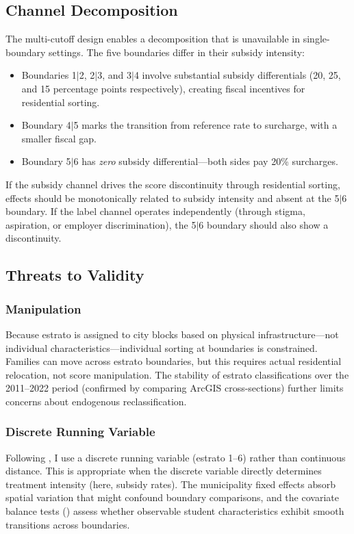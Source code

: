 \documentclass[12pt]{article}
\begin{document}
\subsection{Channel Decomposition}

The multi-cutoff design enables a decomposition that is unavailable in single-boundary settings. The five boundaries differ in their subsidy intensity:

\begin{itemize}
\item Boundaries 1$|$2, 2$|$3, and 3$|$4 involve substantial subsidy differentials (20, 25, and 15 percentage points respectively), creating fiscal incentives for residential sorting.
\item Boundary 4$|$5 marks the transition from reference rate to surcharge, with a smaller fiscal gap.
\item Boundary 5$|$6 has \textit{zero} subsidy differential---both sides pay 20\% surcharges.
\end{itemize}

If the subsidy channel drives the score discontinuity through residential sorting, effects should be monotonically related to subsidy intensity and absent at the 5$|$6 boundary. If the label channel operates independently (through stigma, aspiration, or employer discrimination), the 5$|$6 boundary should also show a discontinuity.

\subsection{Threats to Validity}

\subsubsection*{Manipulation} Because estrato is assigned to city blocks based on physical infrastructure---not individual characteristics---individual sorting at boundaries is constrained. Families can move across estrato boundaries, but this requires actual residential relocation, not score manipulation. The stability of estrato classifications over the 2011--2022 period (confirmed by comparing ArcGIS cross-sections) further limits concerns about endogenous reclassification.

\subsubsection*{Discrete Running Variable} Following \citet{lee2008randomized}, I use a discrete running variable (estrato 1--6) rather than continuous distance. This is appropriate when the discrete variable directly determines treatment intensity (here, subsidy rates). The municipality fixed effects absorb spatial variation that might confound boundary comparisons, and the covariate balance tests () assess whether observable student characteristics exhibit smooth transitions across boundaries.
\end{document}
